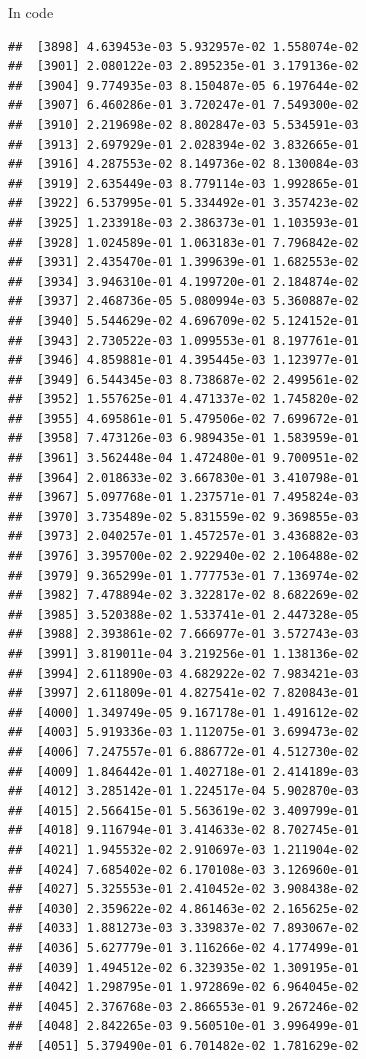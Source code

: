 \documentclass[ignorenonframetext,]{beamer}
\begin{document}
\begin{frame}[fragile]{In code}
\begin{verbatim}
##  [3898] 4.639453e-03 5.932957e-02 1.558074e-02
##  [3901] 2.080122e-03 2.895235e-01 3.179136e-02
##  [3904] 9.774935e-03 8.150487e-05 6.197644e-02
##  [3907] 6.460286e-01 3.720247e-01 7.549300e-02
##  [3910] 2.219698e-02 8.802847e-03 5.534591e-03
##  [3913] 2.697929e-01 2.028394e-02 3.832665e-01
##  [3916] 4.287553e-02 8.149736e-02 8.130084e-03
##  [3919] 2.635449e-03 8.779114e-03 1.992865e-01
##  [3922] 6.537995e-01 5.334492e-01 3.357423e-02
##  [3925] 1.233918e-03 2.386373e-01 1.103593e-01
##  [3928] 1.024589e-01 1.063183e-01 7.796842e-02
##  [3931] 2.435470e-01 1.399639e-01 1.682553e-02
##  [3934] 3.946310e-01 4.199720e-01 2.184874e-02
##  [3937] 2.468736e-05 5.080994e-03 5.360887e-02
##  [3940] 5.544629e-02 4.696709e-02 5.124152e-01
##  [3943] 2.730522e-03 1.099553e-01 8.197761e-01
##  [3946] 4.859881e-01 4.395445e-03 1.123977e-01
##  [3949] 6.544345e-03 8.738687e-02 2.499561e-02
##  [3952] 1.557625e-01 4.471337e-02 1.745820e-02
##  [3955] 4.695861e-01 5.479506e-02 7.699672e-01
##  [3958] 7.473126e-03 6.989435e-01 1.583959e-01
##  [3961] 3.562448e-04 1.472480e-01 9.700951e-02
##  [3964] 2.018633e-02 3.667830e-01 3.410798e-01
##  [3967] 5.097768e-01 1.237571e-01 7.495824e-03
##  [3970] 3.735489e-02 5.831559e-02 9.369855e-03
##  [3973] 2.040257e-01 1.457257e-01 3.436882e-03
##  [3976] 3.395700e-02 2.922940e-02 2.106488e-02
##  [3979] 9.365299e-01 1.777753e-01 7.136974e-02
##  [3982] 7.478894e-02 3.322817e-02 8.682269e-02
##  [3985] 3.520388e-02 1.533741e-01 2.447328e-05
##  [3988] 2.393861e-02 7.666977e-01 3.572743e-03
##  [3991] 3.819011e-04 3.219256e-01 1.138136e-02
##  [3994] 2.611890e-03 4.682922e-02 7.983421e-03
##  [3997] 2.611809e-01 4.827541e-02 7.820843e-01
##  [4000] 1.349749e-05 9.167178e-01 1.491612e-02
##  [4003] 5.919336e-03 1.112075e-01 3.699473e-02
##  [4006] 7.247557e-01 6.886772e-01 4.512730e-02
##  [4009] 1.846442e-01 1.402718e-01 2.414189e-03
##  [4012] 3.285142e-01 1.224517e-04 5.902870e-03
##  [4015] 2.566415e-01 5.563619e-02 3.409799e-01
##  [4018] 9.116794e-01 3.414633e-02 8.702745e-01
##  [4021] 1.945532e-02 2.910697e-03 1.211904e-02
##  [4024] 7.685402e-02 6.170108e-03 3.126960e-01
##  [4027] 5.325553e-01 2.410452e-02 3.908438e-02
##  [4030] 2.359622e-02 4.861463e-02 2.165625e-02
##  [4033] 1.881273e-03 3.339837e-02 7.893067e-02
##  [4036] 5.627779e-01 3.116266e-02 4.177499e-01
##  [4039] 1.494512e-02 6.323935e-02 1.309195e-01
##  [4042] 1.298795e-01 1.972869e-02 6.964045e-02
##  [4045] 2.376768e-03 2.866553e-01 9.267246e-02
##  [4048] 2.842265e-03 9.560510e-01 3.996499e-01
##  [4051] 5.379490e-01 6.701482e-02 1.781629e-02

\end{verbatim}
\end{frame}
\end{document}
